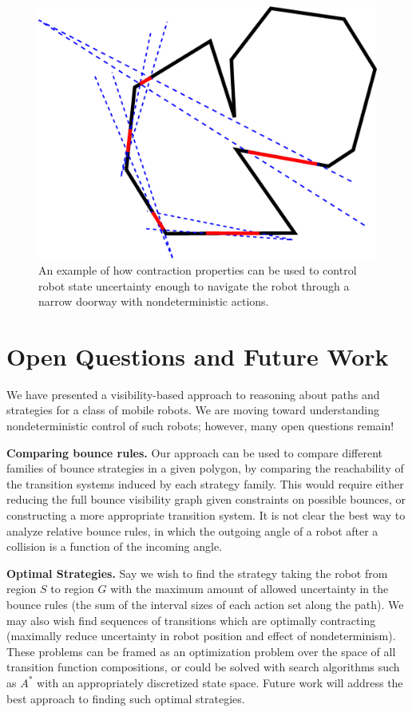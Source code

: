 \documentclass[sageh,times,Review]{sagej}
\begin{document}
\begin{figure}
\centering
\includegraphics[width=0.8\columnwidth]{bounce_preimages.eps}
\caption{An example of how contraction properties can be used to control
robot state uncertainty enough to navigate the robot through a narrow doorway
with nondeterministic actions.}
\label{fig:preimage_example}
\end{figure}


\section{Open Questions and Future Work}

We have presented a visibility-based approach to reasoning about 
paths and strategies for a class of mobile robots. We are moving toward
understanding nondeterministic control of such robots; however, many open
questions remain!

\textbf{Comparing bounce rules.} Our approach can be used to compare different families of
bounce strategies in a given polygon, by comparing the reachability of the
transition systems induced by each strategy family. This would require 
either reducing the full bounce visibility graph given constraints on
possible bounces, or constructing a more appropriate transition
system. It is not clear the best way to analyze relative bounce rules, in which the
outgoing angle of a robot after a collision is a function of the incoming angle.

\textbf{Optimal Strategies.} Say we wish to
find the strategy taking the robot from region $S$ to region $G$ with the
maximum amount of allowed uncertainty in the bounce rules (the sum of the
interval sizes of each action set along the path). We may also wish find sequences of
transitions which are optimally contracting (maximally reduce uncertainty in robot
position and effect of nondeterminism). These problems can be framed as
an optimization problem over the space of all transition function compositions,
or could be solved with search algorithms such as $A^*$ with an appropriately
discretized state space. Future work will address the best approach to finding
such optimal strategies.
\end{document}

